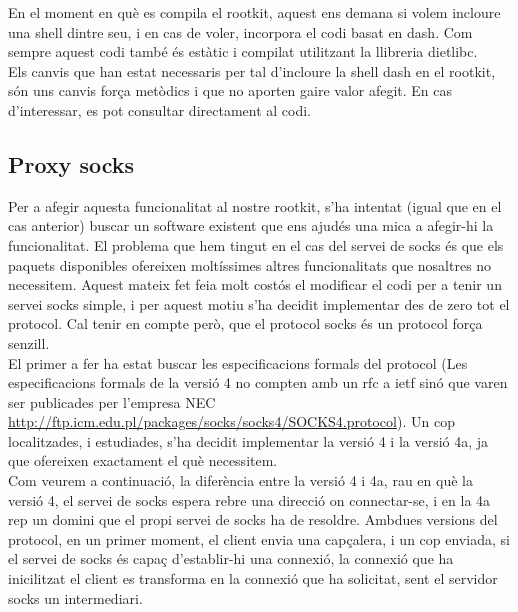 En el moment en què es compila el rootkit, aquest ens demana si volem incloure una shell dintre seu, i en
cas de voler, incorpora el codi basat en dash. Com sempre aquest codi també és estàtic i compilat utilitzant
la llibreria dietlibc. \\

Els canvis que han estat necessaris per tal d'incloure la shell dash en el rootkit, són uns canvis força
metòdics i que no aporten gaire valor afegit. En cas d'interessar, es pot consultar directament al codi.\\

\subsection{Proxy socks}
Per a afegir aquesta funcionalitat al nostre rootkit, s'ha intentat (igual que en el cas anterior) buscar
un software existent que ens ajudés una mica a afegir-hi la funcionalitat. El problema que hem tingut en el cas del servei de
socks és que els paquets disponibles ofereixen moltíssimes altres funcionalitats que nosaltres no
necessitem. Aquest mateix fet feia molt costós el modificar el codi per a tenir un servei socks simple, i 
per aquest motiu s'ha decidit implementar des de zero tot el protocol. Cal tenir en compte però,
que el protocol socks és un protocol força senzill. \\

El primer a fer ha estat buscar les especificacions formals del protocol (Les especificacions 
formals de la versió 4 no compten amb un rfc a ietf sinó que varen ser publicades per l'empresa NEC \url{http://ftp.icm.edu.pl/packages/socks/socks4/SOCKS4.protocol}). Un cop localitzades, i estudiades, s'ha decidit implementar la versió 4 i la versió 4a, ja 
que ofereixen exactament el què necessitem. \\

Com veurem a continuació, la diferència entre la versió 4 i 4a, rau en què la versió 4, el servei de socks
espera rebre una direcció on connectar-se, i en la 4a rep un domini que el propi servei de socks ha de
resoldre. Ambdues versions del protocol, en un primer moment, el client envia una capçalera, i un cop enviada,
si el servei de socks és capaç d'establir-hi una connexió, la connexió que ha inicilitzat el client es
transforma en la connexió que ha solicitat, sent el servidor socks un intermediari.

